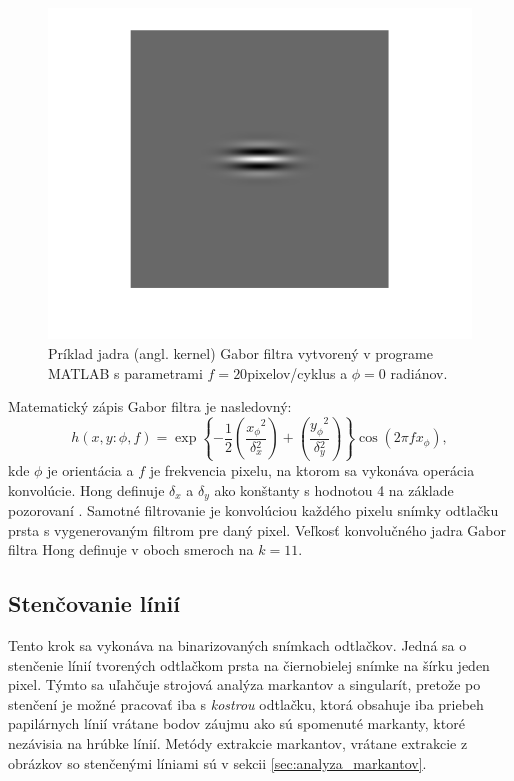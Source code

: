   \begin{figure}[h]
    \centering
    \includegraphics[width=0.25\linewidth]{obrazky-figures/gabor_kernel.png}
    \caption{Príklad jadra (angl. kernel) Gabor filtra vytvorený v programe MATLAB s parametrami $f = 20$pixelov/cyklus a $\phi{} = 0$ radiánov.}
    \label{obr:gabor_kernel}
  \end{figure}
  Matematický zápis Gabor filtra je nasledovný:
  \begin{equation}
    h(x,y: \phi{}, f) = \exp{\left\{ -\frac{1}{2} \left( \frac{x_\phi{}^2}{\delta{}_x^2} \right) + \left( \frac{y_\phi{}^2}{\delta{}_y^2} \right) \right\}} \cos{}\left(2\pi{}fx_\phi{}\right),
  \end{equation}
  kde $\phi{}$ je orientácia a $f$ je frekvencia pixelu, na ktorom sa vykonáva operácia konvolúcie. Hong definuje $\delta{}_x$ a $\delta{}_y$
  ako konštanty s hodnotou 4 na základe pozorovaní \cite{Hong}. Samotné filtrovanie je konvolúciou každého pixelu snímky odtlačku prsta s vygenerovaným filtrom
  pre daný pixel. Veľkosť konvolučného jadra Gabor filtra Hong definuje v oboch smeroch na $k = 11$.

  \subsection{Stenčovanie línií}
  Tento krok sa vykonáva na binarizovaných snímkach odtlačkov. Jedná sa o stenčenie línií tvorených odtlačkom prsta na čiernobielej snímke na šírku
  jeden pixel. Týmto sa uľahčuje strojová analýza markantov a singularít, pretože po stenčení je možné pracovať iba s \emph{kostrou} odtlačku,
  ktorá obsahuje iba priebeh papilárnych línií vrátane bodov záujmu ako sú spomenuté markanty, ktoré nezávisia na hrúbke línií.
  Metódy extrakcie markantov, vrátane extrakcie z obrázkov so stenčenými líniami sú v sekcii \ref{sec:analyza_markantov}.
  
